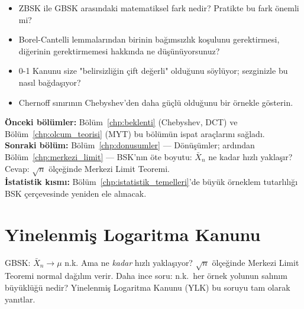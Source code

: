 \begin{ozyansima}
\begin{itemize}
  \item ZBSK ile GBSK arasındaki matematiksel fark nedir? Pratikte bu fark önemli mi?
  \item Borel-Cantelli lemmalarından birinin bağımsızlık koşulunu gerektirmesi,
        diğerinin gerektirmemesi hakkında ne düşünüyorsunuz?
  \item 0-1 Kanunu size "belirsizliğin çift değerli" olduğunu söylüyor;
        sezginizle bu nasıl bağdaşıyor?
  \item Chernoff sınırının Chebyshev'den daha güçlü olduğunu bir örnekle gösterin.
\end{itemize}
\end{ozyansima}

\begin{kopru}
\textbf{Önceki bölümler:} Bölüm~\ref{chp:beklenti} (Chebyshev, DCT) ve
Bölüm~\ref{chp:olcum_teorisi} (MYT) bu bölümün ispat araçlarını sağladı.\\
\textbf{Sonraki bölüm:} Bölüm~\ref{chp:donusumler} --- Dönüşümler;
ardından Bölüm~\ref{chp:merkezi_limit} --- BSK'nın öte boyutu:
$\bar{X}_n$ ne kadar hızlı yaklaşır? Cevap: $\sqrt{n}$ ölçeğinde Merkezi Limit Teoremi.\\
\textbf{İstatistik kısmı:} Bölüm~\ref{chp:istatistik_temelleri}'de büyük örneklem
tutarlılığı BSK çerçevesinde yeniden ele alınacak.
\end{kopru}

\section{Yinelenmiş Logaritma Kanunu}
\label{sec:yil_kanunu}

\begin{motivasyon}
GBSK: $\bar{X}_n \to \mu$ n.k. Ama ne \emph{kadar} hızlı yaklaşıyor?
$\sqrt{n}$ ölçeğinde Merkezi Limit Teoremi normal dağılım verir.
Daha ince soru: n.k.\ her örnek yolunun salınım büyüklüğü nedir?
Yinelenmiş Logaritma Kanunu (YLK) bu soruyu tam olarak yanıtlar.
\end{motivasyon}

